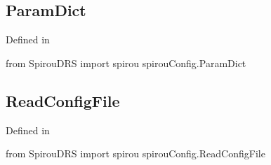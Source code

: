 \begin{minipage}{\textwidth}
\subsection{ParamDict}

Defined in \spirou {}

\begin{pythonbox}
from SpirouDRS import spirou
spirouConfig.ParamDict

\end{pythonbox}

\begin{pythondocstring}

\end{pythondocstring}
\end{minipage}

\begin{minipage}{\textwidth}
\subsection{ReadConfigFile}

Defined in \spirou {}

\begin{pythonbox}
from SpirouDRS import spirou
spirouConfig.ReadConfigFile

\end{pythonbox}

\begin{pythondocstring}

\end{pythondocstring}
\end{minipage}

